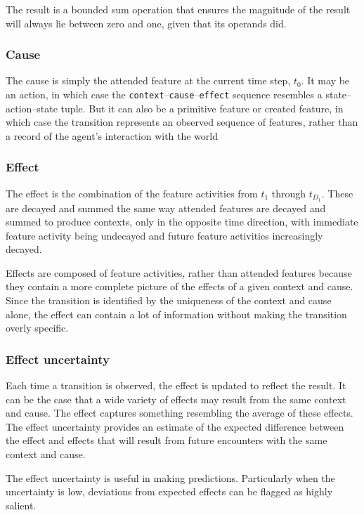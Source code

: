 The result is a bounded sum operation that ensures the magnitude of the result will always lie between zero and one, given that its operands did.


\subsubsection{Cause}
The cause is simply the attended feature at the current time step, $t_0$. It may be an action, in which case the \texttt{context}--\texttt{cause}--\texttt{effect} sequence resembles a state--action--state tuple. But it can also be a primitive feature or created feature, in which case the transition represents an observed sequence of features, rather than a record of the agent's interaction with the world

\subsubsection{Effect}
The effect is the combination of the feature activities from $t_1$ through $t_{D_1}$. These are decayed and summed the same way attended features are decayed and summed to produce contexts, only in the opposite time direction, with immediate feature activity being undecayed and future feature activities increasingly decayed. 

Effects are composed of feature activities, rather than attended features because they contain a more complete picture of the effects of a given context and cause. Since the transition is identified by the uniqueness of the context and cause alone, the effect can contain a lot of information without making the transition overly specific. 

\subsubsection{Effect uncertainty}
Each time a transition is observed, the effect is updated to reflect the result. It can be the case that a wide variety of effects may result from the same context and cause. The effect captures something resembling the average of these effects. The effect uncertainty provides an estimate of the expected difference between the effect and effects that will result from future encounters with the same context and cause. 

The effect uncertainty is useful in making predictions. Particularly when the uncertainty is low, deviations from expected effects can be flagged as highly salient.

